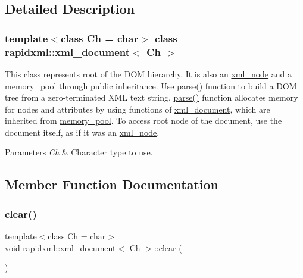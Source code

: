 \subsection{Detailed Description}
\subsubsection*{template$<$class Ch = char$>$\newline
class rapidxml\+::xml\+\_\+document$<$ Ch $>$}

This class represents root of the D\+OM hierarchy. It is also an \mbox{\hyperlink{classrapidxml_1_1xml__node}{xml\+\_\+node}} and a \mbox{\hyperlink{classrapidxml_1_1memory__pool}{memory\+\_\+pool}} through public inheritance. Use \mbox{\hyperlink{classrapidxml_1_1xml__document_ac6e73ff9ac323bf5a370c38feb03a6b1}{parse()}} function to build a D\+OM tree from a zero-\/terminated X\+ML text string. \mbox{\hyperlink{classrapidxml_1_1xml__document_ac6e73ff9ac323bf5a370c38feb03a6b1}{parse()}} function allocates memory for nodes and attributes by using functions of \mbox{\hyperlink{classrapidxml_1_1xml__document}{xml\+\_\+document}}, which are inherited from \mbox{\hyperlink{classrapidxml_1_1memory__pool}{memory\+\_\+pool}}. To access root node of the document, use the document itself, as if it was an \mbox{\hyperlink{classrapidxml_1_1xml__node}{xml\+\_\+node}}. 
\begin{DoxyParams}{Parameters}
{\em Ch} & Character type to use. \\
\hline
\end{DoxyParams}


\subsection{Member Function Documentation}
\mbox{\label{classrapidxml_1_1xml__document_a826929ff54242532198701f19ff5f83f}} 
\subsubsection{\texorpdfstring{clear()}{clear()}}
{\footnotesize\ttfamily template$<$class Ch  = char$>$ \\
void \mbox{\hyperlink{classrapidxml_1_1xml__document}{rapidxml\+::xml\+\_\+document}}$<$ Ch $>$\+::clear (\begin{DoxyParamCaption}{ }\end{DoxyParamCaption})\hspace{0.3cm}{\ttfamily [inline]}}

